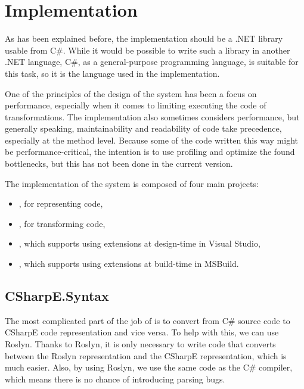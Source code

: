 \chapter{Implementation}

As has been explained before, the implementation should be a .NET library usable from C\#. While it would be possible to write such a library in another .NET language, C\#, as a general-purpose programming language, is suitable for this task, so it is the language used in the implementation.

One of the principles of the design of the system has been a focus on performance, especially when it comes to limiting executing the code of transformations. The implementation also sometimes considers performance, but generally speaking, maintainability and readability of code take precedence, especially at the method level. Because some of the code written this way might be performance-critical, the intention is to use profiling and optimize the found bottlenecks, but this has not been done in the current version.

\medskip

\label{projects}
The implementation of the system is composed of four main projects:

\begin{itemize}
\item {}, for representing code,
\item {}, for transforming code,
\item {}, which supports using extensions at design-time in Visual Studio,
\item {}, which supports using extensions at build-time in MSBuild.
\end{itemize}

\section{CSharpE.Syntax}

The most complicated part of the job of  is to convert from C\# source code to CSharpE code representation and vice versa. To help with this, we can use Roslyn. Thanks to Roslyn, it is only necessary to write code that converts between the Roslyn representation and the CSharpE representation, which is much easier. Also, by using Roslyn, we use the same code as the C\# compiler, which means there is no chance of introducing parsing bugs.

